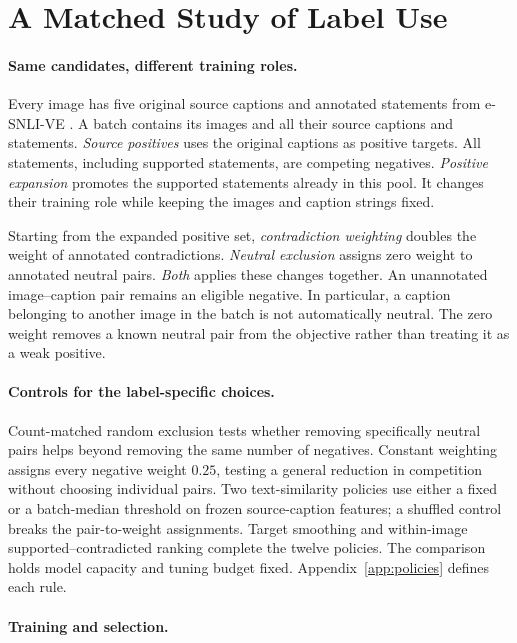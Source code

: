 \documentclass[11pt]{article}
\begin{document}
\section{A Matched Study of Label Use}
\label{sec:study}
\paragraph{Same candidates, different training roles.}
Every image has five original source captions and annotated statements from e-SNLI-VE \citep{kayser2021evil}. A batch contains its images and all their source captions and statements. \emph{Source positives} uses the original captions as positive targets. All statements, including supported statements, are competing negatives. \emph{Positive expansion} promotes the supported statements already in this pool. It changes their training role while keeping the images and caption strings fixed.

Starting from the expanded positive set, \emph{contradiction weighting} doubles the weight of annotated contradictions. \emph{Neutral exclusion} assigns zero weight to annotated neutral pairs. \emph{Both} applies these changes together. An unannotated image--caption pair remains an eligible negative. In particular, a caption belonging to another image in the batch is not automatically neutral. The zero weight removes a known neutral pair from the objective rather than treating it as a weak positive.

\paragraph{Controls for the label-specific choices.}
Count-matched random exclusion tests whether removing specifically neutral pairs helps beyond removing the same number of negatives. Constant weighting assigns every negative weight $0.25$, testing a general reduction in competition without choosing individual pairs. Two text-similarity policies use either a fixed or a batch-median threshold on frozen source-caption features; a shuffled control breaks the pair-to-weight assignments. Target smoothing and within-image supported--contradicted ranking complete the twelve policies. The comparison holds model capacity and tuning budget fixed. Appendix~\ref{app:policies} defines each rule.

\paragraph{Training and selection.}

\end{document}

